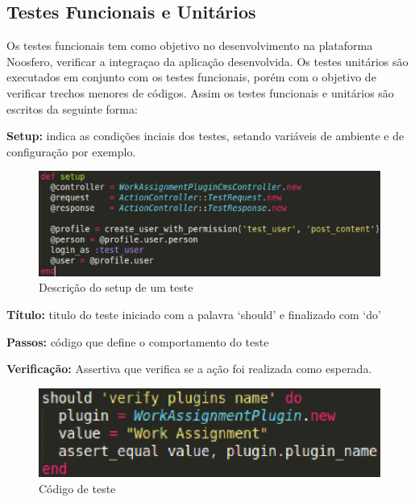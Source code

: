 \subsection{Testes Funcionais e Unitários}
%
Os testes funcionais tem como objetivo no desenvolvimento na plataforma Noosfero, verificar
a integraçao da aplicação desenvolvida.
%
Os testes unitários são executados em conjunto com os testes funcionais, porém  com o objetivo
de verificar trechos menores de códigos.
%
Assim os testes funcionais e unitários são escritos da seguinte forma:

\textbf{Setup:} indica as condições inciais dos testes, setando variáveis de ambiente e de 
configuração por exemplo.

\begin{figure}[!h]
    \centering
    \includegraphics[keepaspectratio=true,scale=0.50]
      {figuras/teste_setup.eps}
    \caption{Descrição do setup de um teste}
    \label{nosfero_setup}
\end{figure}

\textbf{Título:} titulo do teste iniciado com a palavra ‘should’ e finalizado com ‘do’

\textbf{Passos:} código que define o comportamento do teste

\textbf{Verificação:} Assertiva que verifica se a ação foi realizada como esperada.

\begin{figure}[!h]
    \centering
    \includegraphics[keepaspectratio=true,scale=0.55]
      {figuras/teste_should.eps}
    \caption{Código de teste}
    \label{noosfero_should}
\end{figure}

